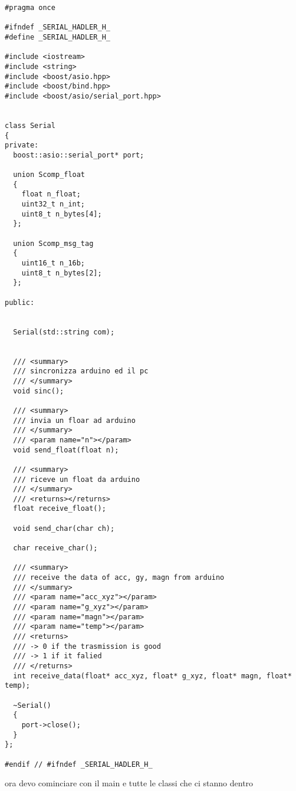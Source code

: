 \documentclass[10pt,a4paper]{article}
\begin{document}
\begin{lstlisting}[style=mycpp, caption=librerie usate, captionpos=b]
#pragma once

#ifndef _SERIAL_HADLER_H_
#define _SERIAL_HADLER_H_

#include <iostream>
#include <string>
#include <boost/asio.hpp> 
#include <boost/bind.hpp>
#include <boost/asio/serial_port.hpp> 


class Serial
{
private:
  boost::asio::serial_port* port;

  union Scomp_float
  {
    float n_float;
    uint32_t n_int;
    uint8_t n_bytes[4];
  };

  union Scomp_msg_tag
  {
    uint16_t n_16b;
    uint8_t n_bytes[2];
  };

public:


  Serial(std::string com);


  /// <summary>
  /// sincronizza arduino ed il pc
  /// </summary>
  void sinc();

  /// <summary>
  /// invia un floar ad arduino
  /// </summary>
  /// <param name="n"></param>
  void send_float(float n);

  /// <summary>
  /// riceve un float da arduino
  /// </summary>
  /// <returns></returns>
  float receive_float();

  void send_char(char ch);

  char receive_char();

  /// <summary>
  /// receive the data of acc, gy, magn from arduino
  /// </summary>
  /// <param name="acc_xyz"></param>
  /// <param name="g_xyz"></param>
  /// <param name="magn"></param>
  /// <param name="temp"></param>
  /// <returns>
  /// -> 0 if the trasmission is good
  /// -> 1 if it falied
  /// </returns>
  int receive_data(float* acc_xyz, float* g_xyz, float* magn, float* temp);

  ~Serial()
  {
    port->close();
  }
};

#endif // #ifndef _SERIAL_HADLER_H_
\end{lstlisting}
%
%
ora devo cominciare con il main e tutte le classi che ci stanno dentro
\end{document}
